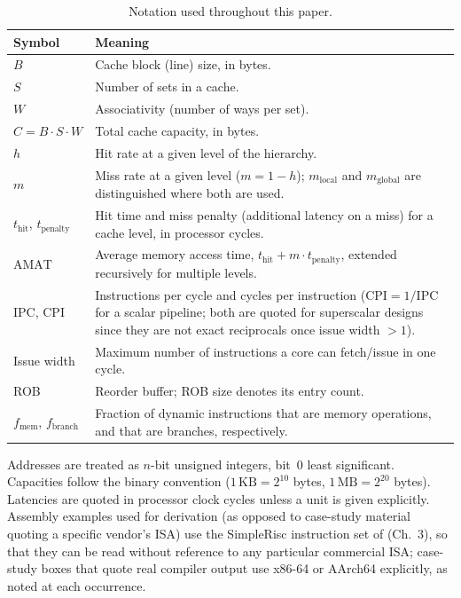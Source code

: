 \documentclass[12pt,a4paper]{report}
\begin{document}
\begin{table}[htbp]
\centering
\caption{Notation used throughout this paper.}
\label{tab:notation}
\begin{tabular}{@{}L{0.16\textwidth}L{0.78\textwidth}@{}}
\toprule
\textbf{Symbol} & \textbf{Meaning} \\
\midrule
$B$ & Cache block (line) size, in bytes. \\
$S$ & Number of sets in a cache. \\
$W$ & Associativity (number of ways per set). \\
$C = B \cdot S \cdot W$ & Total cache capacity, in bytes. \\
$h$ & Hit rate at a given level of the hierarchy. \\
$m$ & Miss rate at a given level ($m = 1-h$); $m_{\text{local}}$ and
  $m_{\text{global}}$ are distinguished where both are used. \\
$t_{\text{hit}}$, $t_{\text{penalty}}$ & Hit time and miss penalty (additional
  latency on a miss) for a cache level, in processor cycles. \\
$\text{AMAT}$ & Average memory access time, $t_{\text{hit}} + m \cdot
  t_{\text{penalty}}$, extended recursively for multiple levels. \\
IPC, CPI & Instructions per cycle and cycles per instruction
  ($\text{CPI} = 1/\text{IPC}$ for a scalar pipeline; both are quoted
  for superscalar designs since they are not exact reciprocals once
  issue width $> 1$). \\
Issue width & Maximum number of instructions a core can fetch/issue in
  one cycle. \\
ROB & Reorder buffer; ROB size denotes its entry count. \\
$f_{\text{mem}}$, $f_{\text{branch}}$ & Fraction of dynamic instructions
  that are memory operations, and that are branches, respectively. \\
\bottomrule
\end{tabular}
\end{table}

Addresses are treated as $n$-bit unsigned integers, bit~0 least
significant. Capacities follow the binary convention
($1\,\text{KB} = 2^{10}$ bytes, $1\,\text{MB} = 2^{20}$ bytes). Latencies
are quoted in processor clock cycles unless a unit is given explicitly.
Assembly examples used for derivation (as opposed to case-study material
quoting a specific vendor's ISA) use the SimpleRisc instruction set of
\cite{sarangi} (Ch.~3), so that they can be read without reference to any
particular commercial ISA; case-study boxes that quote real compiler
output use x86-64 or AArch64 explicitly, as noted at each occurrence.
\end{document}
